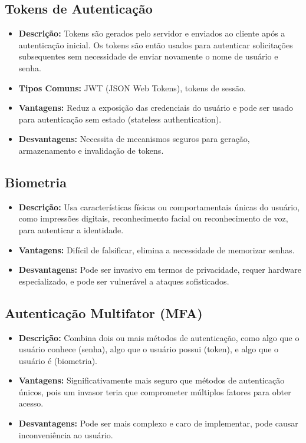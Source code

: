 \documentclass{scrartcl}
\begin{document}
\subsection{Tokens de Autenticação}
\label{sec:org1924b6b}
\begin{itemize}
\item \textbf{\textbf{Descrição:}} Tokens são gerados pelo servidor e enviados ao cliente após
a autenticação inicial. Os tokens são então usados para autenticar
solicitações subsequentes sem necessidade de enviar novamente o nome de
usuário e senha.
\item \textbf{\textbf{Tipos Comuns:}} JWT (JSON Web Tokens), tokens de sessão.
\item \textbf{\textbf{Vantagens:}} Reduz a exposição das credenciais do usuário e pode ser
usado para autenticação sem estado (stateless authentication).
\item \textbf{\textbf{Desvantagens:}} Necessita de mecanismos seguros para geração,
armazenamento e invalidação de tokens.
\end{itemize}

\subsection{Biometria}
\label{sec:orgd482624}
\begin{itemize}
\item \textbf{\textbf{Descrição:}} Usa características físicas ou comportamentais únicas do
usuário, como impressões digitais, reconhecimento facial ou reconhecimento
de voz, para autenticar a identidade.
\item \textbf{\textbf{Vantagens:}} Difícil de falsificar, elimina a necessidade de memorizar
senhas.
\item \textbf{\textbf{Desvantagens:}} Pode ser invasivo em termos de privacidade, requer
hardware especializado, e pode ser vulnerável a ataques sofisticados.
\end{itemize}

\subsection{Autenticação Multifator (MFA)}
\label{sec:orgba188b1}
\begin{itemize}
\item \textbf{\textbf{Descrição:}} Combina dois ou mais métodos de autenticação, como algo que
o usuário conhece (senha), algo que o usuário possui (token), e algo que o
usuário é (biometria).
\item \textbf{\textbf{Vantagens:}} Significativamente mais seguro que métodos de autenticação
únicos, pois um invasor teria que comprometer múltiplos fatores para obter
acesso.
\item \textbf{\textbf{Desvantagens:}} Pode ser mais complexo e caro de implementar, pode causar
inconveniência ao usuário.
\end{itemize}
\end{document}
